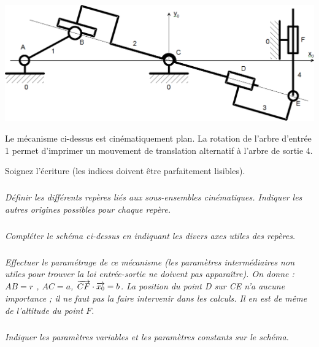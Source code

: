 \documentclass[11pt,oneside]{article}
\begin{document}
\begin{center}
\includegraphics[width=.7\textwidth]{png/fig2_1} 
\end{center}

Le mécanisme ci-dessus est cinématiquement plan. La rotation de l'arbre d'entrée 1 permet d'imprimer un mouvement de translation alternatif à l'arbre de sortie 4.

\begin{rem}
Soignez l'écriture (les indices doivent être parfaitement lisibles).
\end{rem}

\subparagraph{}
\textit{Définir les différents repères liés aux sous-ensembles cinématiques. Indiquer les autres origines possibles pour chaque repère.}




\subparagraph{}
\textit{Compléter le schéma ci-dessus en indiquant les divers axes utiles des repères.}




\subparagraph{}
\textit{Effectuer le paramétrage de ce mécanisme (les paramètres intermédiaires non utiles pour trouver la loi entrée-sortie ne doivent pas apparaître). On donne : $AB = r$ , $AC = a$, $\overrightarrow{CF}\cdot\overrightarrow{x_0}=b$. La position du point D sur CE n'a aucune importance ; il ne faut pas la faire intervenir dans les calculs. Il en est de même de l'altitude du point $F$.}




\subparagraph{}
\textit{Indiquer les paramètres variables et les paramètres constants sur le schéma.}


\end{document}
